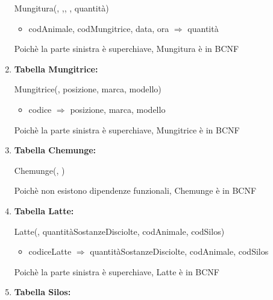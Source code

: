 \documentclass[12pt,a4paper]{article}
\begin{document}
\begin{enumerate}
Mungitura(\underline{}, \underline{},\underline{}, \underline{}, quantità)
\begin{itemize}
\vspace{-5pt}
\item codAnimale, codMungitrice, data, ora $\Rightarrow$ quantità
\vspace{-5pt}
\end{itemize}
Poichè la parte sinistra è superchiave, Mungitura è in BCNF
\vspace{10pt}



\item[] \textbf{Tabella Mungitrice:}

Mungitrice(\underline{}, posizione, marca, modello)
\begin{itemize}
\vspace{-5pt}
\item codice $\Rightarrow$ posizione, marca, modello
\vspace{-5pt}
\end{itemize}
Poichè la parte sinistra è superchiave, Mungitrice è in BCNF
\vspace{10pt}



\item[] \textbf{Tabella Chemunge:}

Chemunge(\underline{}, \underline{})

Poichè non esistono dipendenze funzionali, Chemunge è in BCNF
\vspace{10pt}



\item[] \textbf{Tabella Latte:}

Latte(\underline{}, quantitàSostanzeDisciolte,  codAnimale,  codSilos)
\begin{itemize}
\vspace{-5pt}
\item codiceLatte $\Rightarrow$ quantitàSostanzeDisciolte, codAnimale, codSilos
\vspace{-5pt}
\end{itemize}
Poichè la parte sinistra è superchiave, Latte è in BCNF
\vspace{10pt}



\item[] \textbf{Tabella Silos:}


\end{enumerate}
\end{document}
